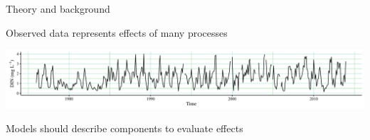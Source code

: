 \documentclass[xcolor=dvipsnames,serif]{beamer}\usepackage[]{graphicx}\usepackage[]{color}
\begin{document}
\begin{frame}[t]{Theory and background}
\onslide<+->
{\bf \centerline{Observed data represents effects of many processes}}
\vspace{0.15in}
\centerline{\includegraphics[width = \textwidth]{imgs/ts_ex.pdf}}
\centerline{Models should describe components to evaluate effects}
\vspace{-0.1in}
\begin{columns}[t]
\begin{column}{0.5\textwidth}
\end{column}
\begin{column}{0.5\textwidth}
\end{column}
\end{columns}
\end{frame}
\end{document}
